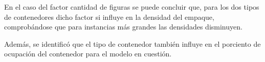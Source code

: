 \documentclass[5p,times]{elsarticle}
\begin{document}
En el caso del factor cantidad de figuras se puede concluir que, para los dos tipos de contenedores dicho factor si influye en la densidad del empaque, comprobándose que para instancias más grandes las densidades disminuyen.

Además, se identificó que el tipo de contenedor también influye en el porciento de ocupación del contenedor para el modelo en cuestión.

 


%

%





%

%


\end{document}
